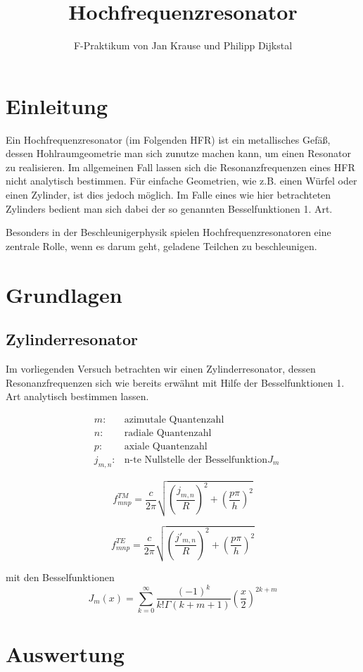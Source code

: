 \documentclass[10pt,article,colorback,accentcolor=tud9d]{scrartcl}
\title{Hochfrequenzresonator}
\subtitle{F-Praktikum von Jan Krause und Philipp Dijkstal}
\begin{document}
\maketitle

\tableofcontents

\newpage

\section{Einleitung}
Ein Hochfrequenzresonator (im Folgenden HFR) ist ein metallisches Gefäß, dessen Hohlraumgeometrie man sich zunutze machen kann,
um einen Resonator zu realisieren. Im allgemeinen Fall lassen sich die Resonanzfrequenzen eines HFR nicht analytisch bestimmen.
Für einfache Geometrien, wie z.B. einen Würfel oder einen Zylinder, ist dies jedoch möglich. Im Falle eines wie hier betrachteten
Zylinders bedient man sich dabei der so genannten Besselfunktionen 1. Art.

Besonders in der Beschleunigerphysik spielen Hochfrequenzresonatoren eine zentrale Rolle, wenn es darum geht, geladene Teilchen
zu beschleunigen.

\section{Grundlagen}

\subsection{Zylinderresonator}
Im vorliegenden Versuch betrachten wir einen Zylinderresonator, dessen Resonanzfrequenzen sich wie bereits erwähnt mit Hilfe der
Besselfunktionen 1. Art analytisch bestimmen lassen.

\begin{align*}
&m: &\text{azimutale Quantenzahl}\\
&n: &\text{radiale Quantenzahl}\\
&p: &\text{axiale Quantenzahl}\\
&j_{m,n}: &\text{n-te Nullstelle der Besselfunktion} J_m
\end{align*}


\begin{equation}
 f_{mnp}^{TM} = \frac{c}{2\pi} \sqrt{\left(\frac{j_{m,n}}{R}\right)^2 + \left(\frac{p\pi}{h}\right)^2}
\end{equation}

\begin{equation}
 f_{mnp}^{TE} = \frac{c}{2\pi} \sqrt{\left(\frac{j'_{m,n}}{R}\right)^2 + \left(\frac{p\pi}{h}\right)^2}
\end{equation}

mit den Besselfunktionen
\begin{equation}
 J_m(x) = \sum_{k=0}^{\infty} \frac{(-1)^k}{k! \Gamma(k+m+1)} \left(\frac{x}{2}\right)^{2k+m}
\end{equation}





\section{Auswertung}
\end{document}
